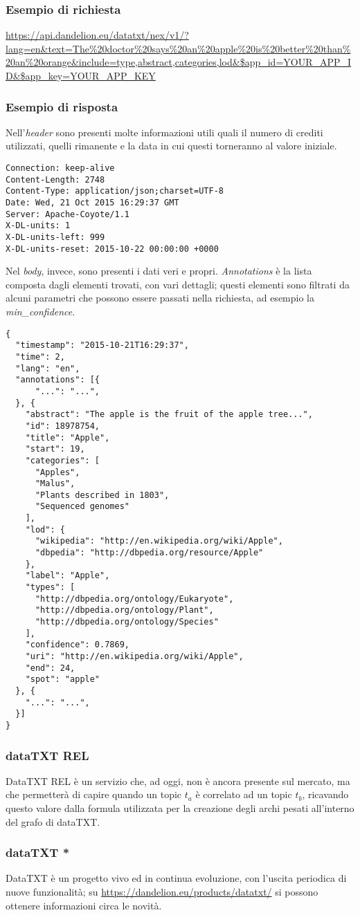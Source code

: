 	\subsubsection{Esempio di richiesta}
		\url{https://api.dandelion.eu/datatxt/nex/v1/?lang=en&text=The%20doctor%20says%20an%20apple%20is%20better%20than%20an%20orange&include=type,abstract,categories,lod&$app_id=YOUR_APP_ID&$app_key=YOUR_APP_KEY}
        \subsubsection{Esempio di risposta}
		Nell'\emph{header} sono presenti molte informazioni utili quali il numero di crediti utilizzati, quelli rimanente e la data in cui questi torneranno al valore iniziale.
		
		\begin{lstlisting}
Connection: keep-alive
Content-Length: 2748
Content-Type: application/json;charset=UTF-8
Date: Wed, 21 Oct 2015 16:29:37 GMT
Server: Apache-Coyote/1.1
X-DL-units: 1
X-DL-units-left: 999
X-DL-units-reset: 2015-10-22 00:00:00 +0000
		\end{lstlisting}

		Nel \emph{body}, invece, sono presenti i dati veri e propri. \emph{Annotations} è la lista composta dagli elementi trovati, con vari dettagli; questi elementi sono filtrati da alcuni parametri che possono essere passati nella richiesta,  ad esempio la \emph{min\_confidence}.

		\begin{lstlisting}
{
  "timestamp": "2015-10-21T16:29:37",
  "time": 2,
  "lang": "en",
  "annotations": [{
      "...": "...",
  }, {
    "abstract": "The apple is the fruit of the apple tree...",
    "id": 18978754,
    "title": "Apple",
    "start": 19,
    "categories": [
      "Apples",
      "Malus",
      "Plants described in 1803",
      "Sequenced genomes"
    ],
    "lod": {
      "wikipedia": "http://en.wikipedia.org/wiki/Apple",
      "dbpedia": "http://dbpedia.org/resource/Apple"
    },
    "label": "Apple",
    "types": [
      "http://dbpedia.org/ontology/Eukaryote",
      "http://dbpedia.org/ontology/Plant",
      "http://dbpedia.org/ontology/Species"
    ],
    "confidence": 0.7869,
    "uri": "http://en.wikipedia.org/wiki/Apple",
    "end": 24,
    "spot": "apple"
  }, {
    "...": "...",
  }]
}
		\end{lstlisting}

\subsubsection{dataTXT REL}
	DataTXT REL  è un servizio che, ad oggi, non è ancora presente sul mercato, ma che permetterà di capire quando un topic $t_a$ è correlato ad un topic $t_b$, ricavando questo valore dalla formula utilizzata per la creazione degli archi pesati all'interno del grafo di dataTXT.

\subsubsection{dataTXT *}
	DataTXT è un progetto vivo ed in continua evoluzione, con l'uscita periodica di nuove funzionalità; su \url{https://dandelion.eu/products/datatxt/} si possono ottenere informazioni circa le novità.




